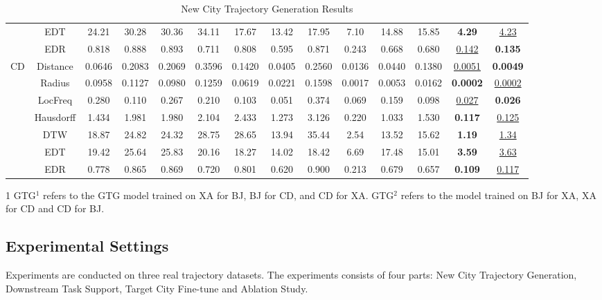 \begin{table*}[t]
\begin{tabular}{c|c|cccccccccc|cc}
    & EDT & 24.21 & 30.28 & 30.36 & 34.11 & 17.67 & 13.42 & 17.95 & 7.10 & 14.88 & 15.85 & \textbf{4.29} & \underline{4.23} \\ 
    & EDR & 0.818 & 0.888 & 0.893 & 0.711 & 0.808 & 0.595 & 0.871 & 0.243 & 0.668 & 0.680 & \underline{0.142} & \textbf{0.135} \\ 
\midrule
\multirow{7}{*}{CD} & Distance & 0.0646 & 0.2083 & 0.2069 & 0.3596 & 0.1420 & 0.0405 & 0.2560 & 0.0136 & 0.0440 & 0.1380 & \underline{0.0051} & \textbf{0.0049} \\ 
    & Radius & 0.0958 & 0.1127 & 0.0980 & 0.1259 & 0.0619 & 0.0221 & 0.1598 & 0.0017 & 0.0053 & 0.0162 & \textbf{0.0002} & \underline{0.0002} \\ 
    & LocFreq & 0.280 & 0.110 & 0.267 & 0.210 & 0.103 & 0.051 & 0.374 & 0.069 & 0.159 & 0.098 & \underline{0.027} & \textbf{0.026} \\ 
    & Hausdorff & 1.434 & 1.981 & 1.980 & 2.104 & 2.433 & 1.273 & 3.126 & 0.220 & 1.033 & 1.530 & \textbf{0.117} & \underline{0.125} \\ 
    & DTW & 18.87 & 24.82 & 24.32 & 28.75 & 28.65 & 13.94 & 35.44 & 2.54 & 13.52 & 15.62 & \textbf{1.19} & \underline{1.34} \\ 
    & EDT & 19.42 & 25.64 & 25.83 & 20.16 & 18.27 & 14.02 & 18.42 & 6.69 & 17.48 & 15.01 & \textbf{3.59} & \underline{3.63} \\ 
    & EDR & 0.778 & 0.865 & 0.869 & 0.720 & 0.801 & 0.620 & 0.900 & 0.213 & 0.679 & 0.657 & \textbf{0.109} & \underline{0.117} \\ 
\bottomrule
\end{tabular}
\caption{New City Trajectory Generation Results 
}
\label{tab:main_table}
\begin{tablenotes}
\footnotesize
\item [1] GTG$^1$ refers to the GTG model trained on XA for BJ, BJ for CD, and CD for XA. GTG$^2$ refers to the model trained on BJ for XA, XA for CD and CD for BJ.
\end{tablenotes}
\end{table*}

\subsection{Experimental Settings}
Experiments are conducted on three real trajectory datasets. The experiments consists of four parts: New City Trajectory Generation, Downstream Task Support, Target City Fine-tune and Ablation Study.

